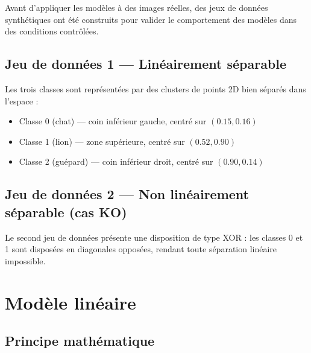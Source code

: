 \documentclass[12pt, a4paper]{report}
\begin{document}
Avant d'appliquer les modèles à des images réelles, des jeux de données
synthétiques ont été construits pour valider le comportement des modèles
dans des conditions contrôlées.

\subsection{Jeu de données 1 — Linéairement séparable}


Les trois classes sont représentées par des clusters de points 2D
bien séparés dans l'espace :

\begin{itemize}
    \item Classe 0 (chat) — coin inférieur gauche, centré sur $(0.15, 0.16)$
    \item Classe 1 (lion) — zone supérieure, centré sur $(0.52, 0.90)$
    \item Classe 2 (guépard) — coin inférieur droit, centré sur $(0.90, 0.14)$
\end{itemize}


\subsection{Jeu de données 2 — Non linéairement séparable (cas KO)}


Le second jeu de données présente une disposition de type XOR : les
classes 0 et 1 sont disposées en diagonales opposées, rendant toute
séparation linéaire impossible.

\section{Modèle linéaire}

\subsection{Principe mathématique}
\end{document}
